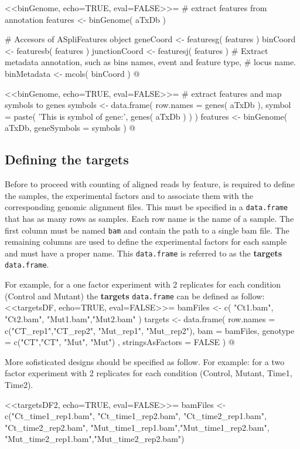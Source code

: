 \documentclass{article}
\begin{document}
<<binGenome, echo=TRUE, eval=FALSE>>=
# extract features from annotation
features      <- binGenome( aTxDb ) 

# Accesors of ASpliFeatures object 
geneCoord     <- featuresg( features )
binCoord      <- featuresb( features )
junctionCoord <- featuresj( features )
# Extract metadata annotation, such as bins names, event and feature type, 
# locus name.  
binMetadata   <- mcols( binCoord )
@

<<binGenome, echo=TRUE, eval=FALSE>>=
# extract features and map symbols to genes
symbols       <- data.frame( row.names = genes( aTxDb ), 
                             symbol = paste( 'This is symbol of gene:',
                                             genes( aTxDb ) ) )
features      <- binGenome( aTxDb, geneSymbols = symbols ) 
@

\subsection{Defining the targets }
\label{sec:targetsDef}

Before to proceed with counting of aligned reads by feature, is required
to define the samples, the experimental factors and to associate them with the
corresponding genomic alignment files. This must be specified in a 
\texttt{data.frame} that has as many rows as samples. Each row name is the name
of a sample. The first column must be named \texttt{bam} and contain the path to
a single bam file. The remaining columns are used to define the experimental
factors for each sample and must have a proper name. This \texttt{data.frame} is
referred to as the \textbf{targets} \texttt{data.frame}. 

For example, for a one factor experiment with 2 replicates for each condition 
(Control and Mutant) the  \textbf{targets} \texttt{data.frame} can be defined as 
follow:
<<targetsDF, echo=TRUE, eval=FALSE>>=
bamFiles <- c( "Ct1.bam", "Ct2.bam", "Mut1.bam","Mut2.bam" )
targets <- data.frame( row.names =  c("CT_rep1","CT_rep2", "Mut_rep1", "Mut_rep2"),
                       bam = bamFiles,
                       genotype = c("CT","CT", "Mut", "Mut") , 
                       stringsAsFactors = FALSE )
@ 

More sofisticated designs should be specified as follow. For example: for a two
factor experiment with 2 replicates for each condition (Control, Mutant, Time1,
Time2).

<<targetsDF2, echo=TRUE, eval=FALSE>>=
bamFiles <- c("Ct_time1_rep1.bam", "Ct_time1_rep2.bam",
              "Ct_time2_rep1.bam", "Ct_time2_rep2.bam",
              "Mut_time1_rep1.bam","Mut_time1_rep2.bam",
              "Mut_time2_rep1.bam","Mut_time2_rep2.bam")
\end{document}
